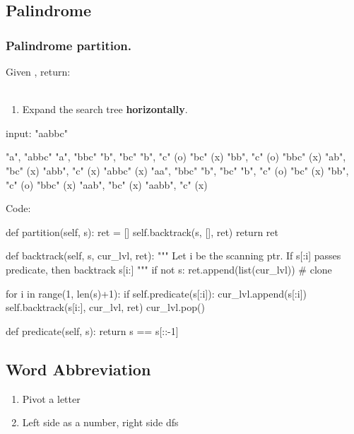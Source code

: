 \subsection{Palindrome}
\subsubsection{Palindrome partition.} Given , return: \\
\pyinline{[["aa","b"], ["a","a","b"]]}
\\
\begin{enumerate}
\item Expand the search tree \textbf{horizontally}.
\end{enumerate}
\begin{python}
input: "aabbc"

"a", "abbc"
     "a", "bbc"
          "b", "bc"
               "b", "c" (o)
               "bc" (x)
          "bb", "c" (o)
          "bbc" (x)
     "ab", "bc" (x)
     "abb", "c" (x)
     "abbc" (x)
"aa", "bbc"
      "b", "bc"
           "b", "c" (o)
           "bc" (x)
      "bb", "c" (o)
      "bbc" (x)
"aab", "bc" (x)
"aabb", "c" (x)
\end{python}
Code:

\begin{python}
def partition(self, s):
    ret = []
    self.backtrack(s, [], ret)
    return ret

def backtrack(self, s, cur_lvl, ret):
    """
    Let i be the scanning ptr.
    If s[:i] passes predicate, then backtrack s[i:]
    """
    if not s:
        ret.append(list(cur_lvl))  # clone

    for i in range(1, len(s)+1):
        if self.predicate(s[:i]):
            cur_lvl.append(s[:i])
            self.backtrack(s[i:], cur_lvl, ret)
            cur_lvl.pop()

def predicate(self, s):
    return s == s[::-1]
\end{python}

\subsection{Word Abbreviation}
\begin{enumerate}
\item Pivot a letter
\item Left side as a number, right side dfs 
\end{enumerate}

